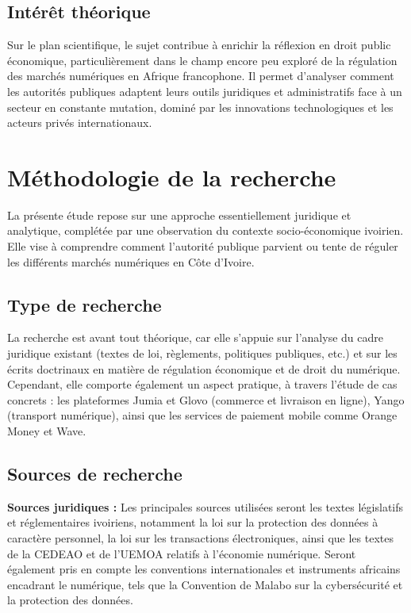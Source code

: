 \subsection*{Intérêt théorique}

Sur le plan scientifique, le sujet contribue à enrichir la réflexion en droit public économique, particulièrement dans le champ encore peu exploré de la régulation des marchés numériques en Afrique francophone.
Il permet d’analyser comment les autorités publiques adaptent leurs outils juridiques et administratifs face à un secteur en constante mutation, dominé par les innovations technologiques et les acteurs privés internationaux.

\section*{Méthodologie de la recherche}

La présente étude repose sur une approche essentiellement juridique et analytique, complétée par une observation du contexte socio-économique ivoirien. Elle vise à comprendre comment l’autorité publique parvient ou tente de réguler les différents marchés numériques en Côte d’Ivoire.

\subsection*{Type de recherche}

La recherche est avant tout théorique, car elle s’appuie sur l’analyse du cadre juridique existant (textes de loi, règlements, politiques publiques, etc.) et sur les écrits doctrinaux en matière de régulation économique et de droit du numérique.
Cependant, elle comporte également un aspect pratique, à travers l’étude de cas concrets : les plateformes Jumia et Glovo (commerce et livraison en ligne), Yango (transport numérique), ainsi que les services de paiement mobile comme Orange Money et Wave.

\subsection*{Sources de recherche}

\textbf{Sources juridiques :}
Les principales sources utilisées seront les textes législatifs et réglementaires ivoiriens, notamment la loi sur la protection des données à caractère personnel, la loi sur les transactions électroniques, ainsi que les textes de la CEDEAO et de l’UEMOA relatifs à l’économie numérique.
Seront également pris en compte les conventions internationales et instruments africains encadrant le numérique, tels que la Convention de Malabo sur la cybersécurité et la protection des données.

